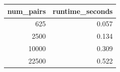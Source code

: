 \begin{tabular}{rr}
\toprule
num\_pairs & runtime\_seconds \\
\midrule
625 & 0.057 \\
2500 & 0.134 \\
10000 & 0.309 \\
22500 & 0.522 \\
\bottomrule
\end{tabular}
